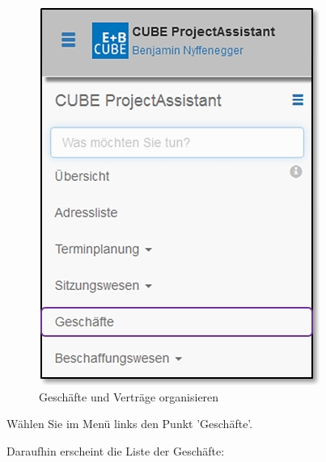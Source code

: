 \begin{figure}   %
  \vspace{-35pt}      %
  \begin{center}
    \includegraphics[width=1\linewidth]{../chapters/06_Geschaefte/pictures/6-1_Menu_Geschaefte.jpg}
  \end{center}
  \vspace{-20pt}
  \caption{Geschäfte und Verträge organisieren}
  \vspace{-10pt}
\end{figure}

Wählen Sie im Menü links den Punkt 'Geschäfte'. \\

\pagebreak

Daraufhin erscheint die Liste der Geschäfte:

